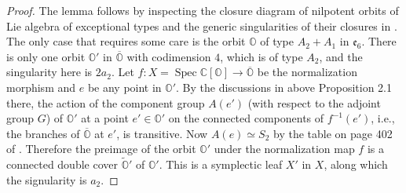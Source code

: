 \documentclass[12pt]{amsart}
\newcommand{\C}{\mathbb{C}}
\newcommand{\Orb}{\mathbb{O}}
\newcommand{\Z}{\mathbb{Z}}
\newcommand{\spec}{\operatorname{Spec}}
\newcommand{\slf}{\mathfrak{sl}}
\theoremstyle{definition}
\numberwithin{equation}{section}
\begin{document}
\begin{proof}
	The lemma follows by inspecting the closure diagram of nilpotent orbits of Lie algebra of exceptional types and the generic singularities of their closures in \cite{FJLS1}. The only case that requires some care is the orbit $\Orb$ of type $A_2 + A_1$ in $\mathfrak{e}_6$. There is only one orbit $\Orb'$ in $\overline{\Orb}$ with codimension $4$, which is of type $A_2$, and the singularity here is $2a_2$. Let $f: X=\spec \C[\Orb] \to \overline{\Orb}$ be the normalization morphism and $e$ be any point in $\Orb'$. By the discussions in \cite{FJLS1} above Proposition 2.1 there, the action of the component group $A(e')$ (with respect to the adjoint group $G$) of $\Orb'$ at a point $e' \in \Orb'$ on the connected components of $f^{-1}(e')$, i.e., the branches of $\overline{\Orb}$ at $e'$, is transitive. 
	Now $A(e) \simeq S_2$ by the table on page 402 of \cite{Carter}. Therefore the preimage of the orbit $\Orb'$ under the normalization map $f$ is a connected double cover $\tilde{\Orb}'$ of $\Orb'$. This is a symplectic leaf $X'$ in $X$, along which the signularity is $a_2$.
\end{proof}
\end{document}

